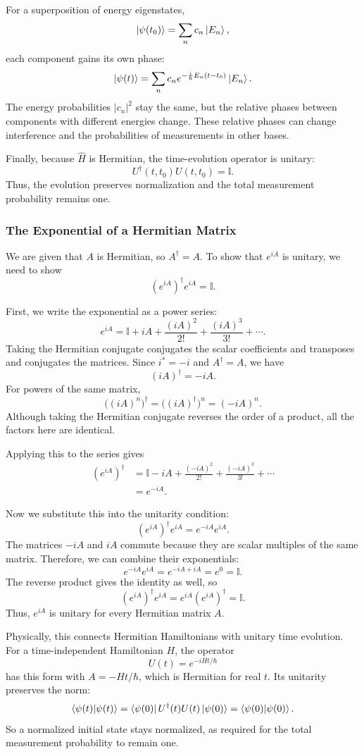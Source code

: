 \documentclass[11pt]{article}
\begin{document}
For a superposition of energy eigenstates,
\[
\ket{\psi(t_0)}=\sum_n c_n\ket{E_n},
\]
each component gains its own phase:
\[
\ket{\psi(t)}
=
\sum_n c_n
e^{-\frac{i}{\hbar}E_n(t-t_0)}\ket{E_n}.
\]
The energy probabilities $|c_n|^2$ stay the same,
but the relative phases between components with
different energies change. These relative phases
can change interference and the probabilities of
measurements in other bases.

Finally, because $\hat{H}$ is Hermitian, the
time-evolution operator is unitary:
\[
U^\dagger(t,t_0)U(t,t_0)=\mathbb{I}.
\]
Thus, the evolution preserves normalization and
the total measurement probability remains one.

\setcounter{subsubsection}{2}
\subsubsection{The Exponential of a Hermitian Matrix}

We are given that $A$ is Hermitian, so $A^\dagger=A$.
To show that $e^{iA}$ is unitary, we need to show
\[
(e^{iA})^\dagger e^{iA}=\mathbb{I}.
\]

First, we write the exponential as a power series:
\[
e^{iA}
=
\mathbb{I}+iA+\frac{(iA)^2}{2!}
+\frac{(iA)^3}{3!}+\cdots.
\]
Taking the Hermitian conjugate conjugates the scalar
coefficients and transposes and conjugates the matrices.
Since $i^*=-i$ and $A^\dagger=A$, we have
\[
(iA)^\dagger=-iA.
\]
For powers of the same matrix,
\[
\big((iA)^n\big)^\dagger
=
\big((iA)^\dagger\big)^n
=
(-iA)^n.
\]
Although taking the Hermitian conjugate reverses the
order of a product, all the factors here are identical.

Applying this to the series gives
\[
\begin{aligned}
(e^{iA})^\dagger
&=
\mathbb{I}-iA+\frac{(-iA)^2}{2!}
+\frac{(-iA)^3}{3!}+\cdots\\
&=e^{-iA}.
\end{aligned}
\]

Now we substitute this into the unitarity condition:
\[
(e^{iA})^\dagger e^{iA}=e^{-iA}e^{iA}.
\]
The matrices $-iA$ and $iA$ commute because they are
scalar multiples of the same matrix. Therefore, we
can combine their exponentials:
\[
e^{-iA}e^{iA}
=
e^{-iA+iA}
=
e^0
=
\mathbb{I}.
\]
The reverse product gives the identity as well, so
\[
\boxed{
(e^{iA})^\dagger e^{iA}
=
e^{iA}(e^{iA})^\dagger
=
\mathbb{I}.
}
\]
Thus, $e^{iA}$ is unitary for every Hermitian matrix $A$.

Physically, this connects Hermitian Hamiltonians with
unitary time evolution. For a time-independent
Hamiltonian $H$, the operator
\[
U(t)=e^{-iHt/\hbar}
\]
has this form with $A=-Ht/\hbar$, which is Hermitian
for real $t$. Its unitarity preserves the norm:
\[
\braket{\psi(t)|\psi(t)}
=
\bra{\psi(0)}U^\dagger(t)U(t)\ket{\psi(0)}
=
\braket{\psi(0)|\psi(0)}.
\]
So a normalized initial state stays normalized, as
required for the total measurement probability to
remain one.
\end{document}
